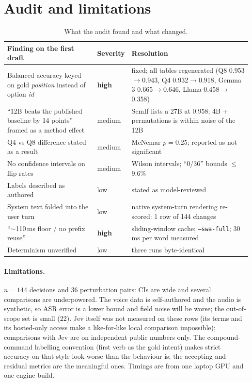 \documentclass[11pt,a4paper]{article}
\newcommand{\code}[1]{\texttt{#1}}
\begin{document}
\section{Audit and limitations}
\label{sec:audit}
\begin{table}[H]
\centering\small
\begin{tabularx}{\textwidth}{X l X}
\toprule
Finding on the first draft & Severity & Resolution \\
\midrule
Balanced accuracy keyed on gold \emph{position} instead of option \emph{id} & \textbf{high} & fixed; all tables regenerated (Q8 0.953$\to$0.943, Q4 0.932$\to$0.918, Gemma 3 0.665$\to$0.646, Llama 0.458$\to$0.358) \\
``12B beats the published baseline by 14 points'' framed as a method effect & medium & SemIf lists a 27B at 0.958; 4B + permutations is within noise of the 12B \\
Q4 vs Q8 difference stated as a result & medium & McNemar $p=0.25$; reported as not significant \\
No confidence intervals on flip rates & medium & Wilson intervals; ``0/36'' bounds $\le$9.6\% \\
Labels described as authored & low & stated as model-reviewed \\
System text folded into the user turn & low & native system-turn rendering re-scored: 1 row of 144 changes \\
``$\sim$110\,ms floor / no prefix reuse'' & \textbf{high} & sliding-window cache; \code{--swa-full}; 30\,ms per word measured \\
Determinism unverified & low & three runs byte-identical \\
\bottomrule
\end{tabularx}
\caption{What the audit found and what changed.}
\end{table}

\paragraph{Limitations.} $n=144$ decisions and 36 perturbation pairs: CIs are wide and several comparisons are underpowered. The voice data is self-authored and the audio is synthetic, so ASR error is a lower bound and field noise will be worse; the out-of-scope set is small (22). Jev itself was not measured on these rows (its terms and its hosted-only access make a like-for-like local comparison impossible); comparisons with Jev are on independent public numbers only. The compound-command labelling convention (first verb as the gold intent) makes strict accuracy on that style look worse than the behaviour is; the accepting and residual metrics are the meaningful ones. Timings are from one laptop GPU and one engine build.
\end{document}
